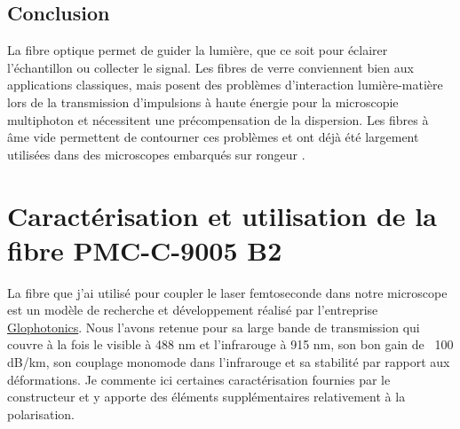 \subsection{Conclusion} %

La fibre optique permet de guider la lumière, que ce soit pour éclairer l'échantillon ou collecter le signal. Les fibres de verre conviennent bien aux applications classiques, mais posent des problèmes d'interaction lumière-matière lors de la transmission d'impulsions à haute énergie pour la microscopie multiphoton et nécessitent une précompensation de la dispersion. Les fibres à âme vide permettent de contourner ces problèmes et ont déjà été largement utilisées dans des microscopes embarqués sur rongeur \cite{tai_two-photon_2004} \cite{flusberg_vivo_2005} \cite{engelbrecht_ultra-compact_2008} \cite{piyawattanametha_vivo_2009} \cite{choi_improving_2014} \cite{klioutchnikov_three-photon_2020}.

\section{Caractérisation et utilisation de la fibre PMC-C-9005 B2}



La fibre que j'ai utilisé pour coupler le laser femtoseconde dans notre microscope est un modèle de recherche et développement réalisé par l'entreprise \href{http://www.glophotonics.fr/}{Glophotonics}. Nous l'avons retenue pour sa large bande de transmission qui couvre à la fois le visible à 488 nm et l'infrarouge à 915 nm, son bon gain de ~100 dB/km, son couplage monomode dans l'infrarouge et sa stabilité par rapport aux déformations. Je commente ici certaines caractérisation fournies par le constructeur et y apporte des éléments supplémentaires relativement à la polarisation.

